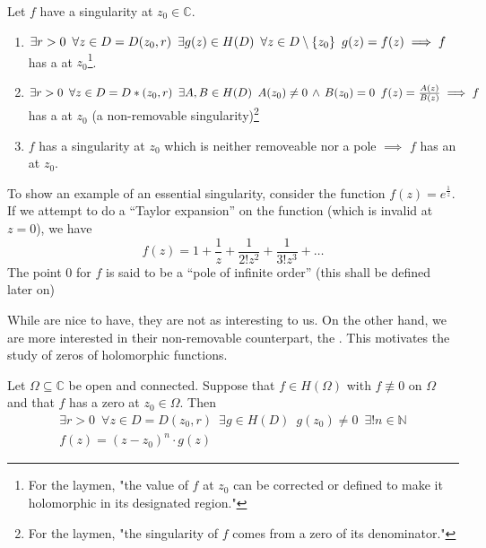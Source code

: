 \documentclass[11pt, oneside]{book}
\begin{document}
\begin{defn}\label{defn:removable_singularity_pole_essential_singularity}
	Let $f$ have a singularity at $z_0 \in \mathbb{C}$.
	\begin{enumerate}
		\item $\exists r > 0 \enspace \forall z \in D = D(z_0, r) \enspace \exists g(z) \in H(D) \enspace \forall z \in D \setminus \{z_0\} \enspace g(z) = f(z) \\ \implies f$ has a  at $z_0$\footnote{For the laymen, "the value of $f$ at $z_0$ can be corrected or defined to make it holomorphic in its designated region."}.

		\item $\exists r > 0 \enspace \forall z \in D = D*(z_0, r) \enspace \exists A, B \in H(D) \enspace A(z_0) \neq 0 \, \land \, B(z_0) = 0 \enspace f(z) = \frac{A(z)}{B(z)} \\ \implies f$ has a  at $z_0$ (a non-removable singularity)\footnote{For the laymen, "the singularity of $f$ comes from a zero of its denominator."}

		\item $f$ has a singularity at $z_0$ which is neither removeable nor a pole $\implies$ $f$ has an  at $z_0$.
	\end{enumerate}
\end{defn}

\begin{eg}
	To show an example of an essential singularity, consider the function $f(z) = e^{\frac{1}{z}}$. If we attempt to do a ``Taylor expansion'' on the function (which is invalid at $z = 0$), we have
	\begin{equation*}
		f(z) = 1 + \frac{1}{z} + \frac{1}{2! z^2} + \frac{1}{3! z^3} + \hdots
	\end{equation*}
	The point $0$ for $f$ is said to be a ``pole of infinite order'' (this shall be defined later on)
\end{eg}

While  are nice to have, they are not as interesting to us. On the other hand, we are more interested in their non-removable counterpart, the . This motivates the study of zeros of holomorphic functions.

\begin{thm}[Theorem 9]\label{thm:theorem_9}
	Let $\Omega \subseteq \mathbb{C}$ be open and connected. Suppose that $f \in H(\Omega)$ with $f \not\equiv 0$ on $\Omega$ and that $f$ has a zero at $z_0 \in \Omega$. Then
	\begin{gather}
		\exists r > 0 \enspace \forall z \in D = D(z_0, r) \enspace \exists g \in H(D) \enspace g(z_0) \neq 0 \enspace \exists! n \in \mathbb{N} \nonumber \\
		f(z) = (z - z_0)^n \cdot g(z) \label{eq:theorem_9_eq}
	\end{gather}
\end{thm}
\end{document}
